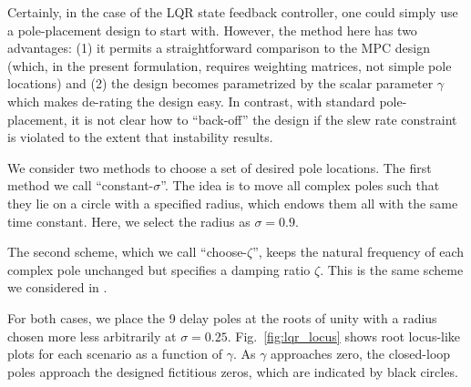 \documentclass[twocolumn,twoside]{IEEEtran}
\begin{document}
Certainly, in the case of the LQR state feedback controller, one could simply use a pole-placement design to start with. However, the method here has two advantages: (1) it permits a straightforward comparison to the MPC design (which, in the present formulation, requires weighting matrices, not simple pole locations) and (2) the design becomes parametrized by the scalar parameter $\gamma$ which makes de-rating the design easy. In contrast, with standard pole-placement, it is not clear how to ``back-off'' the design if the slew rate constraint is violated to the extent that instability results. 

We consider two methods to choose a set of desired pole locations. The first method we call ``constant-$\sigma$''. The idea is to move all complex poles such that they lie on a circle with a specified radius, which endows them all with the same time constant. Here, we select the radius as $\sigma=0.9$.

The second scheme, which we call ``choose-$\zeta$'', keeps the natural frequency of each complex pole unchanged but specifies a damping ratio $\zeta$. This is the same scheme we considered in \cite{braker_fast_2017, braker_application_2017}.

For both cases, we place the 9 delay poles at the roots of unity with a radius chosen more less arbitrarily at ${\sigma=0.25}$. Fig.~\ref{fig:lqr_locus} shows root locus-like plots for each scenario as a function of $\gamma$. As $\gamma$ approaches zero, the closed-loop poles approach the designed fictitious zeros, which are indicated by black circles. 
\end{document}
